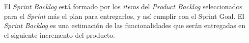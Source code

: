  El {\it Sprint Backlog} está formado por los {\it items} del {\it Product Backlog} seleccionados
 para el {\it Sprint} más el plan para entregarlos, y así cumplir con el Sprint Goal. El {\it Sprint
 Backlog} es una estimación de las funcionalidades que serán entregadas en el siguiente incremento
 del producto.

\clearpage





     
                                         




